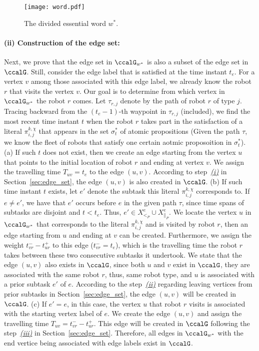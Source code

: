 \documentclass[Afour,sageh,times]{sagej}
\renewcommand{\ap}[3]{\mathcal{\pi}_{{#1},{#2}}^{#3}}
\begin{document}
{{\begin{figure}[!t]
  \centering
  \texttt{[image: word.pdf]}
  \caption{The divided essential word $w^*$.}
  \label{fig:word}
\end{figure}

\paragraph{(ii) Construction of the edge set:}\label{app:edge_set} Next, we prove that the edge set in $\ccalG_{w^*}$ is also a subset of the edge set in $\ccalG$. Still, consider the edge label that is satisfied at the time instant $t_e$. For a vertex $v$ among those associated with this edge label, we already know the robot $r$ that visits the vertex $v$. Our goal is to determine from which vertex in $\ccalG_{w^*}$ the robot $r$ comes. Let $\tau_{r,j}$ denote by the path of robot $r$ of type $j$. Tracing backward from the $(t_{e}-1)$-th waypoint in $\tau_{r,j}$ (included), we find the most recent time instant $t$  when the robot $r$ takes part in the satisfaction of a literal $\ap{i}{j}{k,\chi}$ that appears in the set $\sigma^*_{t}$ of atomic propositions (Given the path $\tau$, we know the fleet of robots that satisfy one certain aotmic proposoition in $\sigma^*_t$). (a) If such $t$ does not exist, then we create an edge starting from the vertex $u$ that points to the initial location of robot $r$ and ending at vertex $v$. We assign the travelling time  $T_{uv}=t_e$ to the edge $(u,v)$. According to step~\hyperref[sec:a]{\it (i)} in Section~\ref{sec:edge_set}, the edge $(u,v)$ is  also  created in $\ccalG$. (b) If such time instant $t$ exists, let $e'$ denote the subtask this literal $\ap{i}{j}{k,\chi}$ corresponds to. If $e\neq e'$, we have that $e'$ occurs before $e$ in the given path $\tau$, since time spans of subtasks are disjoint and $t < t_e$. Thus, $e' \in X_{<_P}^{e} \cup X_{\|_P}^e$. We locate the vertex $u$ in $\ccalG_{w^*}$ that corresponds to the literal $\ap{i}{j}{k,\chi}$ and is visited by robot $r$, then an edge starting from $u$ and ending at $v$ can be created. Furthermore, we assign the weight $t_{vr}^- - t_{ur}^+$ to this edge ($t_{vr}^-=t_e$), which is the travelling time the robot $r$ takes between these two consecutive subtasks it undertook. We state that the edge $(u, v)$ also exists in $\ccalG$, since both $u$ and $v$ exist in $\ccalG$, they are associated with the same robot $r$, thus, same robot type, and $u$ is associated with a prior subtask $e'$ of $e$. According to the step~\hyperref[sec:b]{\it (ii)} regarding leaving vertices from prior subtasks in Section~\ref{sec:edge_set}, the edge $(u,v)$ will be created in $\ccalG$. (c) If $e'=e$, in this case, the vertex $u$ that robot $r$ visits is associated with the starting vertex label of $e$. We create the edge $(u,v)$ and assign the travelling time  $T_{uv} = t_{vr}^- - t_{ur}^+$. This edge will be created in $\ccalG$ following the step~\hyperref[sec:c]{\it (iii)} in Section~\ref{sec:edge_set}. Therefore, all edges in $\ccalG_{w^*}$ with the end vertice being associated with edge labels exist in $\ccalG$.

}}
\end{document}
